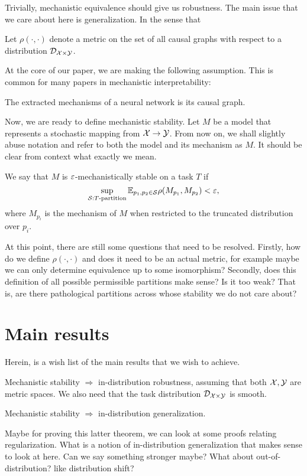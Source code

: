 \documentclass[10pt]{article}
\begin{document}
Trivially, mechanistic equivalence should give us robustness. 
The main issue that we care about here is generalization. In the sense
that

\begin{defn}
Let $\rho(\cdot,\cdot)$ denote a metric on the set of all causal 
graphs with respect to
a distribution $\mathcal{D}_{\mathcal{X}\times\mathcal{Y}}$.
\end{defn}
At the core of our paper, we are making the following assumption. This is 
common for many papers in mechanistic interpretability:
\begin{asmp}
The extracted mechanisms of a neural network is its causal graph. 
\end{asmp}
Now, we are ready to define mechanistic stability. Let $M$ be a model that
represents a stochastic mapping from $\mathcal{X}\to\mathcal{Y}$. From now on, we shall slightly
abuse notation and refer to both the model and its mechanism as $M$. It should
be clear from context what exactly we mean. 
\begin{defn}
We say that $M$ is $\varepsilon$-mechanistically stable on a task $T$ if 
\[
\sup_{\mathcal{S}: T\text{-partition}}\mathbb{E}_{p_1,p_2 \in \mathcal{S}}
\rho(M_{p_1}, M_{p_2}) < \varepsilon,
\]
where $M_{p_i}$ is the mechanism of $M$ when restricted to
the truncated distribution over $p_i$. 
\end{defn}

At this point, there are still some questions that need to be resolved.
Firstly, how do we define $\rho(\cdot,\cdot)$ and does it need to be an
actual metric, for example maybe we can only determine equivalence
up to some isomorphism? Secondly, does this definition of all possible
permissible partitions make sense? Is it too weak? That is, are there
pathological partitions across whose stability we do not care about?

\section{Main results}
Herein, is a wish list of the main results that we wish to achieve.
\begin{thm}
Mechanistic stability $\Rightarrow$ in-distribution 
robustness, assuming that both $\mathcal{X}, \mathcal{Y}$ are metric spaces. 
We also need that the task distribution $\mathcal{D}_{\mathcal{X}\times \mathcal{Y}}$ is smooth.
\end{thm}
\begin{thm}
Mechanistic stability $\Rightarrow$ in-distribution generalization.
\end{thm}
Maybe for proving this latter theorem, we can look at some proofs relating regularization.
What is a notion of in-distribution generalization that makes sense to look
at here. Can we say something stronger maybe? What about out-of-distribution?
like distribution shift?
\end{document}
